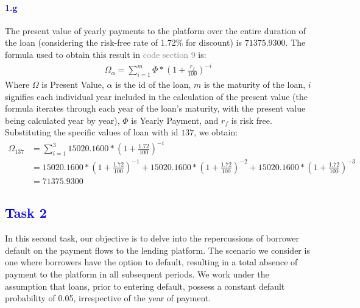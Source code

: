 \documentclass[a4paper,12pt]{article}
\begin{document}
\paragraph{\textcolor{Blue}{1.g}} The present value of yearly payments to the platform over the entire duration of the loan (considering the risk-free rate of 1.72\% for discount) is $71375.9300$. The formula used to obtain this result in \textcolor{gray}{code section 9} is:
\begin{align}\label{present value for all years}
\Omega_{\alpha} = \sum_{i = 1}^{m} \Phi * \left(1 + \frac{r_f}{100} \right)^{- i}
\end{align}
Where $\Omega$ is Present Value, $\alpha$ is the id of the loan, $m$ is the maturity of the loan, $i$ signifies each individual year included in the calculation of the present value (the formula iterates through each year of the loan's maturity, with the present value being calculated year by year), $\Phi$ is Yearly Payment, and $r_f$ is risk free.\\
Substituting the specific values of loan with id $137$, we obtain:
\footnotesize
\begin{align*}
    \Omega_{137} &= \sum_{i = 1}^{3} 15020.1600 * \left(1 + \frac{1.72}{100} \right)^{- i}\\
    &= 15020.1600 * \left(1 + \frac{1.72}{100} \right)^{- 1} + 15020.1600 * \left(1 + \frac{1.72}{100} \right)^{- 2} + 15020.1600 * \left(1 + \frac{1.72}{100} \right)^{- 3}\\
    &= 71375.9300
\end{align*}
\normalsize
\pagebreak
\textcolor{Blue}{\section{Task 2}}
In this second task, our objective is to delve into the repercussions of borrower default on the payment flows to the lending platform. The scenario we consider is one where borrowers have the option to default, resulting in a total absence of payment to the platform in all subsequent periods. We work under the assumption that loans, prior to entering default, possess a constant default probability of 0.05, irrespective of the year of payment.
\end{document}

